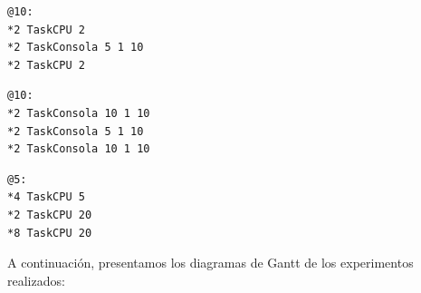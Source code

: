 \documentclass[11pt, a4paper, twoside]{article}
\begin{document}
\begin{minipage}{0.30\textwidth}
\begin{Verbatim}[frame=single,framesep=.5cm,label=interactivo1.tsk]
@10:
*2 TaskCPU 2
*2 TaskConsola 5 1 10
*2 TaskCPU 2
\end{Verbatim}
\end{minipage}
\hfill
\begin{minipage}{0.35\textwidth}
\begin{Verbatim}[frame=single,framesep=.5cm,label=interactivo2.tsk]
@10:
*2 TaskConsola 10 1 10
*2 TaskConsola 5 1 10
*2 TaskConsola 10 1 10
\end{Verbatim}
\end{minipage}
\hfill
\begin{minipage}{0.25\textwidth}
\begin{Verbatim}[frame=single,framesep=.5cm,label=cpu-intensivo.tsk]
@5:
*4 TaskCPU 5
*2 TaskCPU 20
*8 TaskCPU 20
\end{Verbatim}
\end{minipage}


A continuación, presentamos los diagramas de Gantt de los experimentos realizados: 
\end{document}
